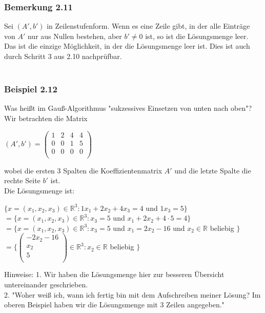 \documentclass{article}
\begin{document}
\subsubsection*{Bemerkung 2.11}
Sei $(A',b')$ in Zeilenstufenform. Wenn es eine Zeile gibt, in der alle Einträge von $A'$ nur aus Nullen bestehen, aber $b' \neq 0$ ist, so ist die Lösungsmenge leer. \\
Das ist die einzige Möglichkeit, in der die Lösungsmenge leer ist. Dies ist auch durch Schritt 3 aus 2.10 nachprüfbar. \\
\\
\subsubsection*{Beispiel 2.12}
Was heißt im Gauß-Algorithmus "sukzessives Einsetzen von unten nach oben"? \\
Wir betrachten die Matrix \\
\begin{center}
    $(A',b') = \begin{pmatrix}
        1 & 2 & 4 & 4 \\
        0 & 0 & 1 & 5 \\
        0 & 0 & 0 & 0 \\
    \end{pmatrix}$
\end{center}
wobei die ersten 3 Spalten die Koeffizientenmatrix $A'$ und die letzte Spalte die rechte Seite $b'$ ist. \\
Die Lösungsmenge ist: \\
\begin{center}
    $\{x=(x_1, x_2, x_3) \in \mathbb{R}^3: 1x_1 + 2x_2 + 4x_3 = 4 $ und $ 1x_3 = 5\}$
    $= \{x=(x_1, x_2, x_3) \in \mathbb{R}^3: x_3=5 $ und $ x_1 + 2x_2 + 4 \cdot 5 = 4\}$
    $= \{x=(x_1, x_2, x_3) \in \mathbb{R}^3: x_3=5 $ und $ x_1 = 2x_2 - 16 $ und $ x_2 \in \mathbb{R} $ beliebig $\}$
    $=\{\begin{pmatrix}
        -2x_2 - 16 \\
        x_2 \\
        5 \\
    \end{pmatrix} \in \mathbb{R}^3: x_2 \in \mathbb{R} $ beliebig $\}$
\end{center}
Hinweise: 1. Wir haben die Lösungsmenge hier zur besseren Übersicht untereinander geschrieben. \\
2. "Woher weiß ich, wann ich fertig bin mit dem Aufschreiben meiner Lösung? Im oberen Beispiel haben wir die Lösungsmenge mit 3 Zeilen angegeben." \\
\end{document}

